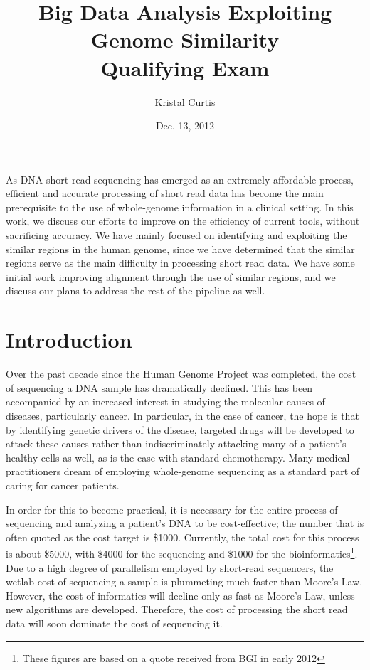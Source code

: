 \documentclass[twocolumn,10pt]{article}
\begin{document}
\title{Big Data Analysis Exploiting Genome Similarity\\ Qualifying Exam}
\author{Kristal Curtis}
\date{Dec. 13, 2012}
\maketitle

\abstract

As DNA short read sequencing has emerged as an extremely affordable process, efficient and accurate processing of short read data has become the main prerequisite to the use of whole-genome information in a clinical setting.  In this work, we discuss our efforts to improve on the efficiency of current tools, without sacrificing accuracy.  We have mainly focused on identifying and exploiting the similar regions in the human genome, since we have determined that the similar regions serve as the main difficulty in processing short read data.  We have some initial work improving alignment through the use of similar regions, and we discuss our plans to address the rest of the pipeline as well.

\section{Introduction} 

Over the past decade since the Human Genome Project was completed, the cost of sequencing a DNA sample has dramatically declined.  This has been accompanied by an increased interest in studying the molecular causes of diseases, particularly cancer.  In particular, in the case of cancer, the hope is that by identifying genetic drivers of the disease, targeted drugs will be developed to attack these causes rather than indiscriminately attacking many of a patient's healthy cells as well, as is the case with standard chemotherapy.  Many medical practitioners dream of employing whole-genome sequencing as a standard part of caring for cancer patients.

In order for this to become practical, it is necessary for the entire process of sequencing and analyzing a patient's DNA to be cost-effective; the number that is often quoted as the cost target is \$1000.  Currently, the total cost for this process is about \$5000, with \$4000 for the sequencing and \$1000 for the bioinformatics\footnote{These figures are based on a quote received from BGI in early 2012}.  Due to a high degree of parallelism employed by short-read sequencers, the wetlab cost of sequencing a sample is plummeting much faster than Moore's Law.  However, the cost of informatics will decline only as fast as Moore's Law, unless new algorithms are developed.  Therefore, the cost of processing the short read data will soon dominate the cost of sequencing it.
\end{document}
